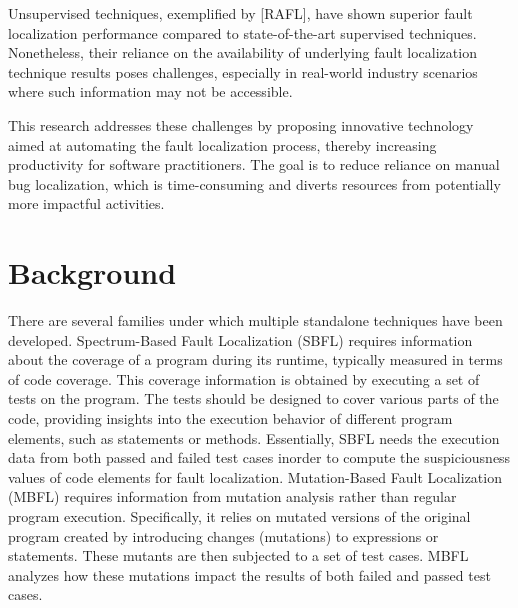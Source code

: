 \documentclass[10pt,conference]{IEEEtran}
\begin{document}
	Unsupervised techniques, exemplified by [RAFL], have shown superior fault localization performance compared to state-of-the-art supervised techniques. Nonetheless, their reliance on the availability of underlying fault localization technique results poses challenges, especially in real-world industry scenarios where such information may not be accessible.
	
	This research addresses these challenges by proposing innovative technology aimed at automating the fault localization process, thereby increasing productivity for software practitioners. The goal is to reduce reliance on manual bug localization, which is time-consuming and diverts resources from potentially more impactful activities.
	
	
	\section{Background}
	There are several families under which multiple standalone techniques have been developed.
	Spectrum-Based Fault Localization (SBFL) requires information about the coverage of a program during its runtime, typically measured in terms of code coverage. This coverage information is obtained by executing a set of tests on the program. The tests should be designed to cover various parts of the code, providing insights into the execution behavior of different program elements, such as statements or methods. Essentially, SBFL needs the execution data from both passed and failed test cases inorder to compute the suspiciousness values of code elements for fault localization.
	Mutation-Based Fault Localization (MBFL) requires information from mutation analysis rather than regular program execution. Specifically, it relies on mutated versions of the original program created by introducing changes (mutations) to expressions or statements. These mutants are then subjected to a set of test cases. MBFL analyzes how these mutations impact the results of both failed and passed test cases.
	
\end{document}
